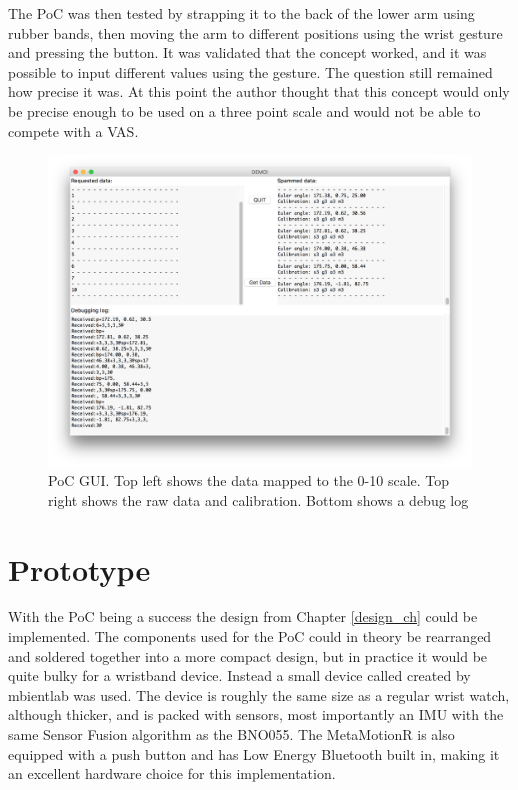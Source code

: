 The PoC was then tested by strapping it to the back of the lower arm using rubber bands, then moving the arm to different positions using the wrist gesture and pressing the button. It was validated that the concept worked, and it was possible to input different values using the gesture. The question still remained how precise it was. At this point the author thought that this concept would only be precise enough to be used on a three point scale and would not be able to compete with a VAS.

\begin{figure}[h!]
    \centering
    \includegraphics[width=1.2\textwidth]{figures/poc_s1.png}
    \caption{PoC GUI. Top left shows the data mapped to the 0-10 scale. Top right shows the raw data and calibration. Bottom shows a debug log}
    \label{poc_s1}
\end{figure}


\section{Prototype}
With the PoC being a success the design from Chapter \ref{design_ch} could be implemented. The components used for the PoC could in theory be rearranged and soldered together into a more compact design, but in practice it would be quite bulky for a wristband device. Instead a small device called  created by mbientlab\cite{mbient} was used. The device is roughly the same size as a regular wrist watch, although thicker, and is packed with sensors, most importantly an IMU with the same Sensor Fusion algorithm as the BNO055. The MetaMotionR is also equipped with a push button and has Low Energy Bluetooth built in, making it an excellent hardware choice for this implementation.

